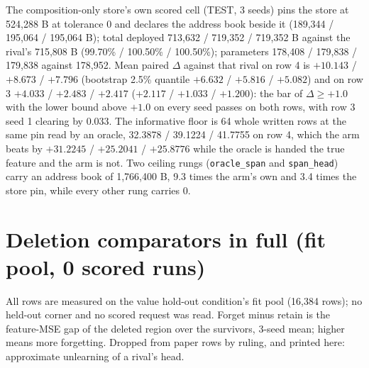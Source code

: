 \documentclass{article} %
\begin{document}
The composition-only store's own scored cell (TEST, 3 seeds) pins the store at 524,288 B at
tolerance 0 and declares the address book beside it (189,344 / 195,064 / 195,064 B); total deployed
713,632 / 719,352 / 719,352 B against the rival's 715,808 B (99.70\% / 100.50\% / 100.50\%);
parameters 178,408 / 179,838 / 179,838 against 178,952. %
Mean paired $\Delta$ against that rival on row 4 is $+10.143$ / $+8.673$ / $+7.796$ (bootstrap
2.5\% quantile $+6.632$ / $+5.816$ / $+5.082$) and on row 3 $+4.033$ / $+2.483$ / $+2.417$
($+2.117$ / $+1.033$ / $+1.200$): the bar of $\Delta\ge+1.0$ with the lower bound above $+1.0$ on
every seed passes on both rows, with row 3 seed 1 clearing by 0.033.
The informative floor is 64 whole written rows at the same pin read by an oracle, 32.3878 / 39.1224
/ 41.7755 on row 4, which the arm beats by $+31.2245$ / $+25.2041$ / $+25.8776$ while the oracle is
handed the true feature and the arm is not. %
Two ceiling rungs (\texttt{oracle\_span} and \texttt{span\_head}) carry an address book of 1,766,400
B, 9.3 times the arm's own and 3.4 times the store pin, while every other rung carries 0.

\section{Deletion comparators in full (fit pool, 0 scored runs)}
\label{app:delbase}

All rows are measured on the value hold-out condition's fit pool (16,384 rows); no held-out corner
and no scored request was read. Forget minus retain is the feature-MSE gap of the deleted region
over the survivors, 3-seed mean; higher means more forgetting. Dropped from paper rows by ruling,
and printed here: approximate unlearning of a rival's head.
\end{document}
